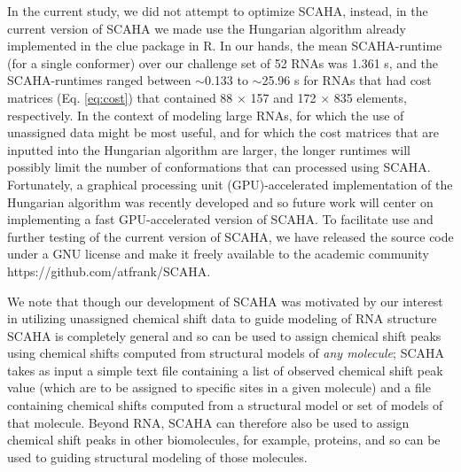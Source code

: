 \documentclass[journal=jcisd8,manuscript=article,layout=onecolumn]{achemso}
\begin{document}
In the current study, we did not attempt to optimize SCAHA, instead, in the current version of SCAHA we made use the Hungarian algorithm already implemented in the clue package in R\cite{hornik2005a}. In our hands, the mean SCAHA-runtime (for a single conformer) over our challenge set of 52 RNAs was 1.361 s, and the SCAHA-runtimes ranged between $\sim$0.133 to $\sim$25.96 s for RNAs that had cost matrices (Eq. \ref{eq:cost}) that contained 88 $\times$ 157  and 172 $\times$ 835 elements, respectively. In the context of modeling large RNAs, for which the use of unassigned data might be most useful, and for which the cost matrices that are inputted into the Hungarian algorithm are larger, the longer runtimes will possibly limit the number of conformations that can processed using SCAHA. Fortunately, a graphical processing unit (GPU)-accelerated implementation of the Hungarian algorithm was recently developed\cite{date2016gpu} and so future work will center on implementing a fast GPU-accelerated version of SCAHA. To facilitate use and further testing of the current version of SCAHA, we have released the source code under a GNU license and make it freely available to the academic community https://github.com/atfrank/SCAHA. 

We note that though our development of SCAHA was motivated by our interest in utilizing unassigned chemical shift data to guide modeling of RNA structure SCAHA is completely general and so can be used to assign chemical shift peaks using chemical shifts computed from structural models of \textit{any molecule}; SCAHA takes as input a simple text file containing a list of observed chemical shift peak value (which are to be assigned to specific sites in a given molecule) and a file containing chemical shifts computed from a structural model or set of models of that molecule. Beyond RNA, SCAHA can therefore also be used to assign chemical shift peaks in other biomolecules, for example, proteins, and so can be used to guiding structural modeling of those molecules.
\end{document}
